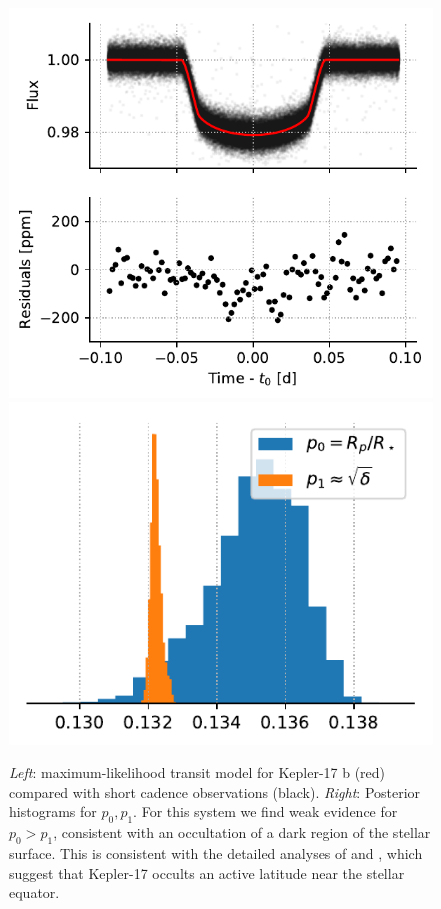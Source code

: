\begin{figure}%
    \centering
    \includegraphics[scale=0.75]{robin/kepler17_residuals_ld.pdf}
    \includegraphics[scale=0.75]{robin/kepler17_agreement_ld.pdf}
    \caption{\textsl{Left}: maximum-likelihood transit model for Kepler-17 b (red) compared with \kepler short cadence observations (black). \textsl{Right}: Posterior histograms for $p_0, p_1$. For this system we find weak evidence for $p_0 > p_1$, consistent with an occultation of a dark region of the stellar surface. This is consistent with the detailed analyses of \citet{Desert2011} and \citet{Davenport2015thesis}, which suggest that Kepler-17 occults an active latitude near the stellar equator.
    }
    \label{fig:kepler17_lc}
\end{figure}

